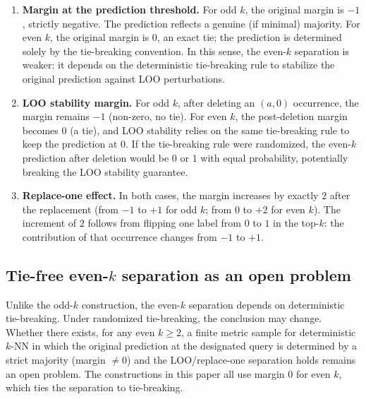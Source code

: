 \begin{enumerate}[leftmargin=*,label=(\arabic*)]
\item \textbf{Margin at the prediction threshold.}  For odd $k$, the original
    margin is $-1$, strictly negative.  The prediction reflects a genuine (if
    minimal) majority.  For even $k$, the original margin is $0$, an exact tie;
    the prediction is determined solely by the tie-breaking convention.  In this
    sense, the even-$k$ separation is weaker: it depends on the deterministic
    tie-breaking rule to stabilize the original prediction against LOO
    perturbations.

\item \textbf{LOO stability margin.}  For odd $k$, after deleting an $(a,0)$
    occurrence, the margin remains $-1$ (non-zero, no tie).  For even $k$, the
    post-deletion margin becomes $0$ (a tie), and LOO stability relies on the
    same tie-breaking rule to keep the prediction at $0$.  If the tie-breaking
    rule were randomized, the even-$k$ prediction after deletion would be $0$ or
    $1$ with equal probability, potentially breaking the LOO stability guarantee.

\item \textbf{Replace-one effect.}  In both cases, the margin increases by
    exactly $2$ after the replacement (from $-1$ to $+1$ for odd $k$; from $0$
    to $+2$ for even $k$).  The increment of $2$ follows from flipping one
    label from $0$ to $1$ in the top-$k$: the contribution of that occurrence
    changes from $-1$ to $+1$.
\end{enumerate}

\subsection{Tie-free even-$k$ separation as an open problem}

Unlike the odd-$k$ construction, the even-$k$ separation depends on
deterministic tie-breaking.  Under randomized tie-breaking, the conclusion may
change.  Whether there exists, for any even $k \ge 2$, a finite metric sample
for deterministic $k$-NN in which the original prediction at the designated
query is determined by a strict majority (margin $\neq 0$) and the
LOO/replace-one separation holds remains an open problem.  The constructions in
this paper all use margin $0$ for even $k$, which ties the separation to
tie-breaking.

